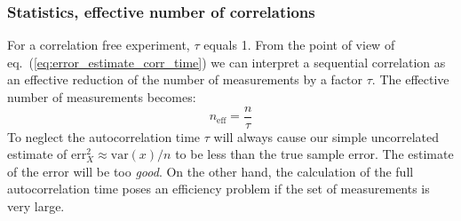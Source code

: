 \documentclass{beamer}
\begin{document}
\begin{frame}
\frametitle{Statistics, effective number of correlations}

\begin{block}{}
For a correlation free experiment, $\tau$
equals 1. From the point of view of
eq.~(\ref{eq:error_estimate_corr_time}) we can interpret a sequential
correlation as an effective reduction of the number of measurements by
a factor $\tau$. The effective number of measurements becomes:
\[
n_\mathrm{eff} = \frac{n}{\tau}
\]
To neglect the autocorrelation time $\tau$ will always cause our
simple uncorrelated estimate of $\mathrm{err}_X^2\approx \mathrm{var}(x)/n$ to
be less than the true sample error. The estimate of the error will be
too \emph{good}. On the other hand, the calculation of the full
autocorrelation time poses an efficiency problem if the set of
measurements is very large.
\end{block}
\end{frame}
\end{document}
